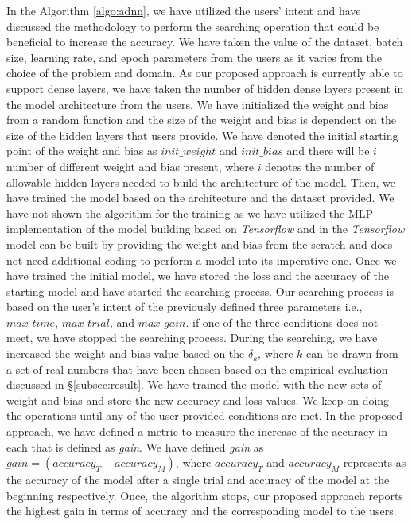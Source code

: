 In the Algorithm \ref{algo:adnn}, we have utilized the users' intent and have discussed the methodology to perform the searching operation that could be beneficial to increase the accuracy. We have taken the value of the dataset, batch size, learning rate, and epoch parameters from the users as it varies from the choice of the problem and domain. As our proposed approach is currently able to support dense layers, we have taken the number of hidden dense layers present in the model architecture from the users. We have initialized the weight and bias from a random function and the size of the weight and bias is dependent on the size of the hidden layers that users provide. We have denoted the initial starting point of the weight and bias as $init\_weight$ and $init\_bias$ and there will be $i$ number of different weight and bias present, where $i$ denotes the number of allowable hidden layers needed to build the architecture of the model. Then, we have trained the model based on the architecture and the dataset provided. We have not shown the algorithm for the training as we have utilized the MLP implementation of the model building based on \emph{Tensorflow} and in the \emph{Tensorflow} model can be built by providing the weight and bias from the scratch and does not need additional coding to perform a model into its imperative one. Once we have trained the initial model, we have stored the loss and the accuracy of the starting model and have started the searching process. Our searching process is based on the user's intent of the previously defined three parameters i.e., $max\_time$, $max\_trial$, and $max\_gain$. if one of the three conditions does not meet, we have stopped the searching process. During the searching, we have increased the weight and bias value based on the $\delta_k$, where $k$ can be drawn from a set of real numbers that have been chosen based on the empirical evaluation discussed in \S\ref{subsec:result}. We have trained the model with the new sets of weight and bias and store the new accuracy and loss values. We keep on doing the operations until any of the user-provided conditions are met. In the proposed approach, we have defined a metric to measure the increase of the accuracy in each that is defined as \emph{gain}. We have defined \emph{gain} as $gain=(accuracy_{T}-accuracy_{M})$, where $accuracy_{T}$ and $accuracy_{M}$ represents as the accuracy of the model after a single trial and accuracy of the model at the beginning respectively. Once, the algorithm stops, our proposed approach reports the highest gain in terms of accuracy and the corresponding model to the users.
